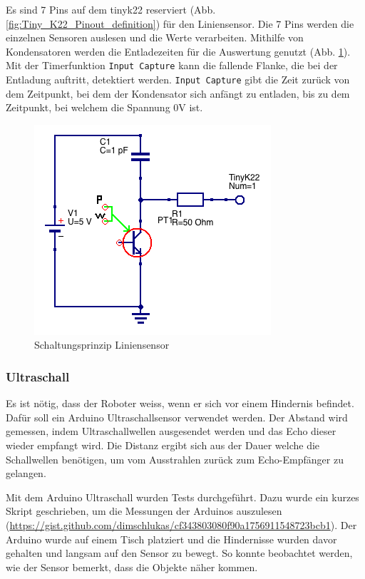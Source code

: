 Es sind 7 Pins auf dem \gls{tinyk22} reserviert (Abb. \ref{fig:Tiny_K22_Pinout_definition}) für den Liniensensor. Die 7 Pins werden die einzelnen Sensoren auslesen und die Werte verarbeiten. Mithilfe von Kondensatoren werden die Entladezeiten für die Auswertung genutzt (Abb. \ref{fig:Liniensensor_Schaltung}). Mit der Timerfunktion \verb|Input Capture| kann die fallende Flanke, die bei der Entladung auftritt, detektiert werden. \verb|Input Capture| gibt die Zeit zurück von dem Zeitpunkt, bei dem der Kondensator sich anfängt zu entladen, bis zu dem Zeitpunkt, bei welchem die Spannung 0V ist.

\begin{figure}[H]
    \centering
    \includegraphics[width=0.4\linewidth]{img/Liniensensor_Schaltung.png}
    \caption{Schaltungsprinzip Liniensensor}
    \label{fig:Liniensensor_Schaltung}
\end{figure}

\subsubsection*{Ultraschall}

Es ist nötig, dass der Roboter weiss, wenn er sich vor einem Hindernis befindet. Dafür soll ein Arduino Ultraschallsensor verwendet werden. Der Abstand wird gemessen, indem Ultraschallwellen ausgesendet werden und das Echo dieser wieder empfangt wird. Die Distanz ergibt sich aus der Dauer welche die Schallwellen benötigen, um vom Ausstrahlen zurück zum Echo-Empfänger zu gelangen.

Mit dem Arduino Ultraschall wurden Tests durchgeführt. Dazu wurde ein kurzes Skript geschrieben, um die Messungen der Arduinos auszulesen (\url{https://gist.github.com/dimschlukas/cf343803080f90a1756911548723bcb1}). Der Arduino wurde auf einem Tisch platziert und die Hindernisse wurden davor gehalten und langsam auf den Sensor zu bewegt. So konnte beobachtet werden, wie der Sensor bemerkt, dass die Objekte näher kommen.

